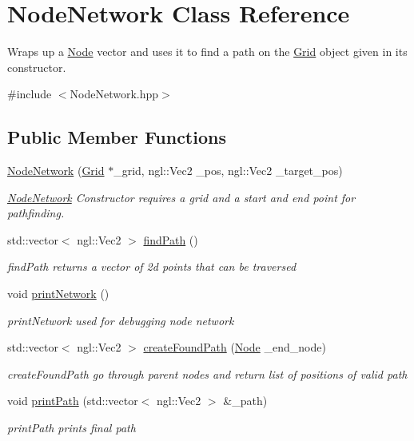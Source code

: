 \hypertarget{class_node_network}{}\section{Node\+Network Class Reference}
\label{class_node_network}


Wraps up a \hyperlink{class_node}{Node} vector and uses it to find a path on the \hyperlink{class_grid}{Grid} object given in its constructor.  




{\ttfamily \#include $<$Node\+Network.\+hpp$>$}

\subsection*{Public Member Functions}
\begin{DoxyCompactItemize}
\item 
\hyperlink{class_node_network_a93ba016a84ac0ec294395fcde8050af4}{Node\+Network} (\hyperlink{class_grid}{Grid} $\ast$\+\_\+grid, ngl\+::\+Vec2 \+\_\+pos, ngl\+::\+Vec2 \+\_\+target\+\_\+pos)
\begin{DoxyCompactList}\small\item\em \hyperlink{class_node_network}{Node\+Network} Constructor requires a grid and a start and end point for pathfinding. \end{DoxyCompactList}\item 
std\+::vector$<$ ngl\+::\+Vec2 $>$ \hyperlink{class_node_network_af34a29c8383e967a871bf75d0be86f8d}{find\+Path} ()
\begin{DoxyCompactList}\small\item\em find\+Path returns a vector of 2d points that can be traversed \end{DoxyCompactList}\item 
\hypertarget{class_node_network_ae97ea4f9c7fad5babb3a13b05a3b971a}{}void \hyperlink{class_node_network_ae97ea4f9c7fad5babb3a13b05a3b971a}{print\+Network} ()\label{class_node_network_ae97ea4f9c7fad5babb3a13b05a3b971a}

\begin{DoxyCompactList}\small\item\em print\+Network used for debugging node network \end{DoxyCompactList}\item 
std\+::vector$<$ ngl\+::\+Vec2 $>$ \hyperlink{class_node_network_af0b9d2a76beb113d7e1ac1e2e259adf3}{create\+Found\+Path} (\hyperlink{class_node}{Node} \+\_\+end\+\_\+node)
\begin{DoxyCompactList}\small\item\em create\+Found\+Path go through parent nodes and return list of positions of valid path \end{DoxyCompactList}\item 
void \hyperlink{class_node_network_a211cc3d6bddaf7bbee62cb18295e11ce}{print\+Path} (std\+::vector$<$ ngl\+::\+Vec2 $>$ \&\+\_\+path)
\begin{DoxyCompactList}\small\item\em print\+Path prints final path \end{DoxyCompactList}\end{DoxyCompactItemize}
